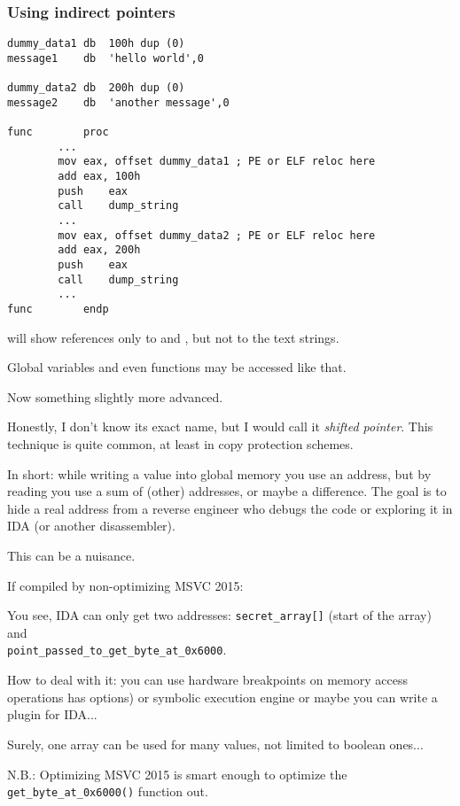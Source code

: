 \subsubsection{Using indirect pointers}

\begin{lstlisting}[style=customasmx86]
dummy_data1	db	100h dup (0)
message1	db	'hello world',0

dummy_data2	db	200h dup (0)
message2	db	'another message',0

func		proc
		...
		mov	eax, offset dummy_data1 ; PE or ELF reloc here
		add	eax, 100h
		push	eax
		call	dump_string
		...
		mov	eax, offset dummy_data2 ; PE or ELF reloc here
		add	eax, 200h
		push	eax
		call	dump_string
		...
func		endp
\end{lstlisting}

\IDA{} will show references only to  and , 
but not to the text strings.

Global variables and even functions may be accessed like that.

Now something slightly more advanced.

Honestly, I don't know its exact name, but I would call it \textit{shifted pointer}.
This technique is quite common, at least in copy protection schemes.

In short: while writing a value into global memory you use an address,
but by reading you use a sum of (other) addresses, or maybe a difference.
The goal is to hide a real address from a reverse engineer who debugs the code or exploring it in IDA
(or another disassembler).

This can be a nuisance.



If compiled by non-optimizing MSVC 2015:



You see, IDA can only get two addresses: \verb|secret_array[]| (start of the array) and \\
\verb|point_passed_to_get_byte_at_0x6000|.

How to deal with it: you can use hardware breakpoints on memory access operations
\tracer has  options) or symbolic execution engine or maybe you can write a plugin for IDA...

Surely, one array can be used for many values, not limited to boolean ones...

N.B.: Optimizing MSVC 2015 is smart enough to optimize the \verb|get_byte_at_0x6000()| function out.


